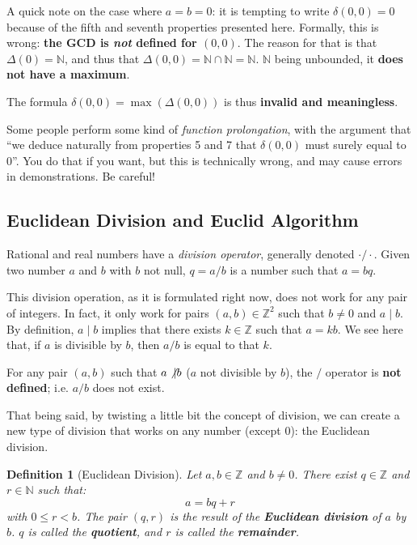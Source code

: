 \documentclass{article}
\newtheorem{definition}{Definition}
\newcommand{\divi}{\mathbin{\mid}}
\begin{document}
A quick note on the case where $a = b = 0$: it is tempting to write $\delta(0,0) = 0$ because of the fifth and seventh properties presented here. Formally, this is wrong: \textbf{the GCD is \textit{not} defined for $(0,0)$}. The reason for that is that $\Delta(0) = \mathbb{N}$, and thus that $\Delta(0,0) = \mathbb{N} \cap \mathbb{N} = \mathbb{N}$. $\mathbb{N}$ being unbounded, it \textbf{does not have a maximum}.

The formula $\delta(0,0) = \max(\Delta(0,0))$ is thus \textbf{invalid and meaningless}.

Some people perform some kind of \textit{function prolongation}, with the argument that ``we deduce naturally from properties 5 and 7 that $\delta(0,0)$ must surely equal to $0$''. You do that if you want, but this is technically wrong, and may cause errors in demonstrations. Be careful!


\subsection{Euclidean Division and Euclid Algorithm}

Rational and real numbers have a \textit{division operator}, generally denoted $\cdot / \cdot$. Given two number $a$ and $b$ with $b$ not null, $q = a / b$ is a number such that $a = b q$.

This division operation, as it is formulated right now, does not work for any pair of integers. In fact, it only work for pairs $(a,b) \in \mathbb{Z}^2$ such that $b \neq 0$ and $a \divi b$. By definition, $a \divi b$ implies that there exists $k \in \mathbb{Z}$ such that $a = k b$. We see here that, if $a$ is divisible by $b$, then $a / b$ is equal to that $k$.

For any pair $(a,b)$ such that $a \not\divi b$ ($a$ not divisible by $b$), the $/$ operator is \textbf{not defined}; i.e. $a / b$ does not exist.

\medskip

That being said, by twisting a little bit the concept of division, we can create a new type of division that works on any number (except 0): the Euclidean division.

\begin{definition}[Euclidean Division]
Let $a,b \in \mathbb{Z}$ and $b \neq 0$. There exist $q \in \mathbb{Z}$ and $r \in \mathbb{N}$ such that:
$$a = b q + r$$
\noindent with $0 \leq r < b$. The pair $(q,r)$ is the result of the \textbf{Euclidean division} of $a$ by $b$. $q$ is called the \textbf{quotient}, and $r$ is called the \textbf{remainder}.
\end{definition}
\end{document}
